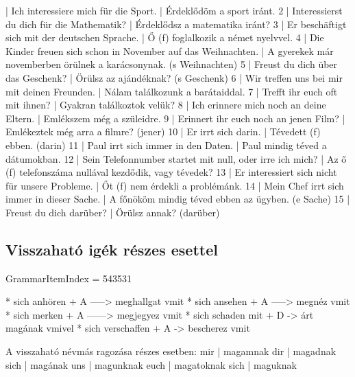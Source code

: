 \documentclass{article}
\newenvironment{desc}{\verbatim}{\endverbatim}
\newenvironment{exmp}{\verbatim}{\endverbatim}
\begin{document}
\begin{exmp}
1 | Ich interessiere mich für die Sport. | Érdeklődöm a sport iránt.
2 | Interessierst du dich für die Mathematik? | Érdeklődsz a matematika iránt?
3 | Er beschäftigt sich mit der deutschen Sprache. | Ő (f) foglalkozik a német nyelvvel.
4 | Die Kinder freuen sich schon in November auf das Weihnachten. | A gyerekek már novemberben örülnek a karácsonynak. (s Weihnachten)
5 | Freust du dich über das Geschenk? | Örülsz az ajándéknak? (s Geschenk)
6 | Wir treffen uns bei mir mit deinen Freunden. | Nálam találkozunk a barátaiddal.
7 | Trefft ihr euch oft mit ihnen? | Gyakran találkoztok velük? 
8 | Ich erinnere mich noch an deine Eltern. | Emlékszem még a szüleidre.
9 | Erinnert ihr euch noch an jenen Film? | Emlékeztek még arra a filmre? (jener) 
10 | Er irrt sich darin. | Tévedett (f) ebben. (darin)
11 | Paul irrt sich immer in den Daten. | Paul mindig téved a dátumokban.
12 | Sein Telefonnumber startet mit null, oder irre ich mich? | Az ő (f) telefonszáma nullával kezdődik, vagy tévedek?
13 | Er interessiert sich nicht für unsere Probleme. | Őt (f) nem érdekli a problémánk.
14 | Mein Chef irrt sich immer in dieser Sache. | A főnököm mindig téved ebben az ügyben. (e Sache)
15 | Freust du dich darüber? | Örülsz annak? (darüber)
\end{exmp}

\subsection{Visszaható igék részes esettel}

GrammarItemIndex = 543531

\begin{desc}
* sich anhören + A -----> meghallgat vmit
* sich ansehen + A -----> megnéz vmit
* sich merken + A ------> megjegyez vmit
* sich schaden mit + D -> árt magának vmivel
* sich verschaffen + A -> bescherez vmit

A visszaható névmás ragozása részes esetben:
mir  | magamnak
dir  | magadnak
sich | magának
uns  | magunknak
euch | magatoknak
sich | maguknak
\end{desc}
\end{document}
